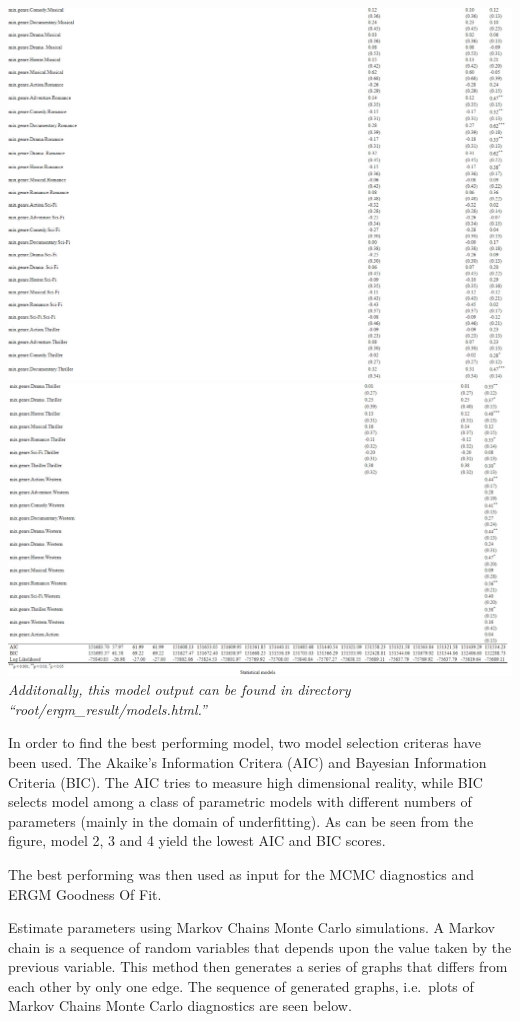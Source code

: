 \documentclass[
  english,
  man,floatsintext]{apa6}
\begin{document}
\includegraphics{ergm_result/model_result3.jpeg}
\includegraphics{ergm_result/model_result4.jpeg}
\emph{Additonally, this model output can be found in directory ``root/ergm\_result/models.html.''}

In order to find the best performing model, two model selection criteras have been used. The Akaike's Information Critera (AIC) and Bayesian Information Criteria (BIC). The AIC tries to measure high dimensional reality, while BIC selects model among a class of parametric models with different numbers of parameters (mainly in the domain of underfitting).
As can be seen from the figure, model 2, 3 and 4 yield the lowest AIC and BIC scores.

The best performing was then used as input for the MCMC diagnostics and ERGM Goodness Of Fit.

Estimate parameters using Markov Chains Monte Carlo simulations. A Markov chain is a sequence of random variables that depends upon the value taken by the previous variable. This method then generates a series of graphs that differs from each other by only one edge.
The sequence of generated graphs, i.e.~plots of Markov Chains Monte Carlo diagnostics are seen below.
\end{document}
